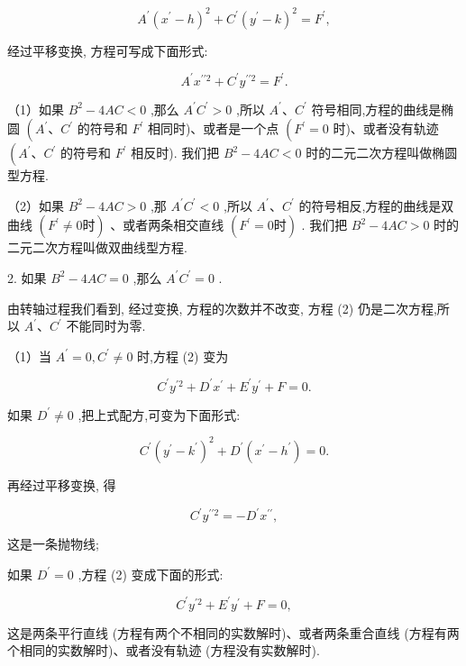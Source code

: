\documentclass[lang=cn,newtx,10pt,scheme=chinese]{elegantbook}
\begin{document}
\[
    {A}^{\prime }{\left( {x}^{\prime } - h\right) }^{2} + {C}^{\prime }{\left( {y}^{\prime } - k\right) }^{2} = {F}^{\prime },
\]

经过平移变换, 方程可写成下面形式:

\[
    {A}^{\prime }{x}^{\prime \prime 2} + {C}^{\prime }{y}^{\prime \prime 2} = {F}^{\prime }.
\]

（1）如果 \({B}^{2} - {4AC} < 0\) ,那么 \({A}^{\prime }{C}^{\prime } > 0\) ,所以 \({A}^{\prime }\text{、}{C}^{\prime }\) 符号相同,方程的曲线是椭圆 \(\left( {{A}^{\prime }\text{、}{C}^{\prime }}\right.\) 的符号和 \({F}^{\prime }\) 相同时)、或者是一个点 \(\left( {{F}^{\prime } = 0}\right.\) 时)、或者没有轨迹 \(\left( {{A}^{\prime }\text{、}{C}^{\prime }}\right.\) 的符号和 \({F}^{\prime }\) 相反时). 我们把 \({B}^{2} - {4AC} < 0\) 时的二元二次方程叫做椭圆型方程.

（2）如果 \({B}^{2} - {4AC} > 0\) ,那 \({A}^{\prime }{C}^{\prime } < 0\) ,所以 \({A}^{\prime }\text{、}{C}^{\prime }\) 的符号相反,方程的曲线是双曲线 \(\left( {{F}^{\prime } \neq 0\text{时}}\right)\) 、或者两条相交直线 \(\left( {{F}^{\prime } = 0\text{时}}\right)\) . 我们把 \({B}^{2} - {4AC} > 0\) 时的二元二次方程叫做双曲线型方程.

2. 如果 \({B}^{2} - {4AC} = 0\) ,那么 \({A}^{\prime }{C}^{\prime } = 0\) .

由转轴过程我们看到, 经过变换, 方程的次数并不改变, 方程 (2) 仍是二次方程,所以 \({A}^{\prime }\text{、}{C}^{\prime }\) 不能同时为零.

（1）当 \({A}^{\prime } = 0,{C}^{\prime } \neq 0\) 时,方程 (2) 变为

\[
    {C}^{\prime }{y}^{\prime 2} + {D}^{\prime }{x}^{\prime } + {E}^{\prime }{y}^{\prime } + F = 0.
\]

如果 \({D}^{\prime } \neq 0\) ,把上式配方,可变为下面形式:

\[
    {C}^{\prime }{\left( {y}^{\prime } - {k}^{\prime }\right) }^{2} + {D}^{\prime }\left( {{x}^{\prime } - {h}^{\prime }}\right) = 0.
\]

再经过平移变换, 得

\[
    {C}^{\prime }{y}^{\prime \prime 2} = - {D}^{\prime }{x}^{\prime \prime },
\]

这是一条抛物线;

如果 \({D}^{\prime } = 0\) ,方程 (2) 变成下面的形式:

\[
    {C}^{\prime }{y}^{\prime 2} + {E}^{\prime }{y}^{\prime } + F = 0,
\]

这是两条平行直线 (方程有两个不相同的实数解时)、或者两条重合直线 (方程有两个相同的实数解时)、或者没有轨迹 (方程没有实数解时).
\end{document}
